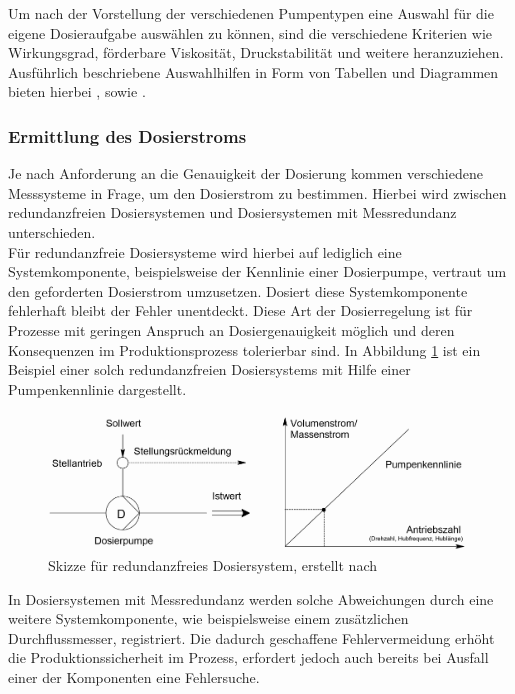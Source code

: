 Um nach der Vorstellung der verschiedenen Pumpentypen eine Auswahl für die eigene Dosieraufgabe auswählen zu können, sind die verschiedene Kriterien wie Wirkungsgrad, förderbare Viskosität, Druckstabilität und weitere heranzuziehen. Ausführlich beschriebene Auswahlhilfen in Form von Tabellen und Diagrammen bieten hierbei \cite[S. 125, 219, 659 ff.]{Vetter.2002}, sowie \cite[S. 224 ff.]{Bierwerth.2019}.


\subsubsection{Ermittlung des Dosierstroms}
Je nach Anforderung an die Genauigkeit der Dosierung kommen verschiedene Messsysteme in Frage, um den Dosierstrom zu bestimmen. Hierbei wird zwischen redundanzfreien Dosiersystemen und Dosiersystemen mit Messredundanz unterschieden. \\
Für redundanzfreie Dosiersysteme wird hierbei auf lediglich eine Systemkomponente, beispielsweise der Kennlinie einer Dosierpumpe, vertraut um den geforderten Dosierstrom umzusetzen. Dosiert diese Systemkomponente fehlerhaft bleibt der Fehler unentdeckt. Diese Art der Dosierregelung ist für Prozesse mit geringen Anspruch an Dosiergenauigkeit möglich und deren Konsequenzen im Produktionsprozess tolerierbar sind. In Abbildung \ref{fig:redundanzfrei} ist ein Beispiel einer solch redundanzfreien Dosiersystems mit Hilfe einer Pumpenkennlinie dargestellt.

\begin{figure}[h!]
	\centering
	\includegraphics[width=1.0\textwidth]{img/redundanzfrei}
	\caption{Skizze für redundanzfreies Dosiersystem, erstellt nach \cite{Vetter.2002}}
	\label{fig:redundanzfrei}
\end{figure}
\FloatBarrier

In Dosiersystemen mit Messredundanz werden solche Abweichungen durch eine weitere Systemkomponente, wie beispielsweise einem zusätzlichen Durchflussmesser, registriert. Die dadurch geschaffene Fehlervermeidung erhöht die Produktionssicherheit im Prozess, erfordert jedoch auch bereits bei Ausfall einer der Komponenten eine Fehlersuche.

